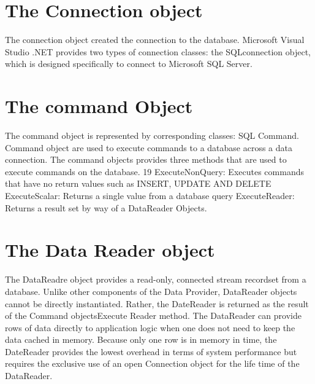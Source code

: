 \section{The Connection object}
The connection object created the connection to the database. Microsoft Visual Studio .NET provides two types of connection classes: the SQLconnection object, which is designed specifically to connect to Microsoft SQL Server.
\section{The command Object}
The command object is represented by corresponding classes: SQL Command. Command object are used to execute commands to a database across a data connection. The command objects provides three methods that are used to execute commands on the database.
19
 ExecuteNonQuery: Executes commands that have no return values such as INSERT, UPDATE AND DELETE
 ExecuteScalar: Returns a single value from a database query
 ExecuteReader: Returns a result set by way of a DataReader Objects.
\section{The Data Reader object}
The DataReadre object provides a read-only, connected stream recordset from a database. Unlike other components of the Data Provider, DataReader objects cannot be directly instantiated. Rather, the DateReader is returned as the result of the Command objectsExecute Reader method. The DataReader can provide rows of data directly to application logic when one does not need to keep the data cached in memory. Because only one row is in memory in time, the DateReader provides the lowest overhead in terms of system performance but requires the exclusive use of an open Connection object for the life time of the DataReader.
